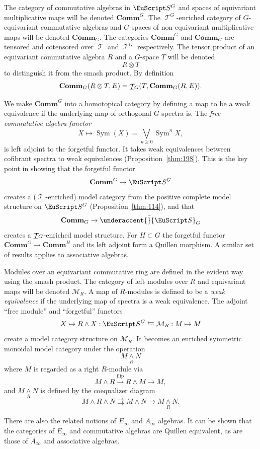 \documentclass{amsart}
\theoremstyle{definition}
\theoremstyle{remark}
\DeclareMathOperator{\sym}{Sym}
\newcommand{\spectra}{\EuScript S}
\newcommand{\rmod}[1]{\mathcal M_{#1}}
\DeclareMathOperator{\spaces}{\mathcal T}
\newcommand{\smashove}[1]{\underset{#1}{\wedge}}
\newcommand{\einfty}{E_{\infty}}
\newcommand{\ainfty}{A_{\infty}}
\newcommand{\einftycat}{\mathbf{Comm}}
\newcommand{\geinftycat}[1]{\einftycat_{#1}}
\newcommand{\ugeinftycat}[1]{\einftycat^{#1}}
\newcommand{\gspaces}[1]{\underline{\spaces\mkern-4mu}\mkern4mu_{\!#1}}
\newcommand{\ugspaces}[1]{\spaces^{#1}}
\newcommand{\gspectra}[1]{\underaccent{\bar}{\spectra}_{#1}}
\newcommand{\ugspectra}[1]{\spectra^{#1}}
\begin{document}
The category of commutative algebras in $\ugspectra{G}$ and spaces of
equivariant multiplicative maps will be denoted $\ugeinftycat{G}$.
The $\ugspaces{G}$-enriched category of $G$-equivariant commutative
algebras and $G$-spaces of non-equivariant multiplicative maps will be
denoted $\geinftycat{G}$.  The categories $\ugeinftycat{G}$ and
$\geinftycat{G}$ are tensored and cotensored over $\spaces$ and
$\ugspaces{G}$ respectively.  The tensor product of an equivariant
commutative algebra $R$ and a $G$-space $T$ will be denoted
\[
R\otimes T
\]
to distinguish it from the smash product.  By definition
\[
\geinftycat{G}(R\otimes T, E) = \gspaces{G}(T,\geinftycat{G}(R,E)).
\]

We make $\ugeinftycat{G}$ into a homotopical category by defining a
map to be a weak equivalence if the underlying map of orthogonal
$G$-spectra is.  The {\em free commutative algebra functor}
\[
X\mapsto \sym(X)=\bigvee_{n\ge 0}\sym^{n}X,
\]
is left adjoint to the forgetful functor.  It takes weak equivalences
between cofibrant spectra to weak equivalences
(Proposition~\ref{thm:198}).  This is the key point in showing that
the forgetful functor
\[
\ugeinftycat{G}\to \ugspectra{G}
\]
creates a ($\spaces$-enriched) model category from the positive
complete model structure on $\ugspectra{G}$
(Proposition~\ref{thm:114}), and that
\[
\geinftycat{G}\to \gspectra{G}
\]
creates a $\gspaces{G}$-enriched model structure.    For $H\subset G$
the forgetful functor $\ugeinftycat{G}\to \ugeinftycat{H}$ and its
left adjoint form a Quillen morphism.   A similar set of results
applies to associative algebras.

Modules over an equivariant commutative ring are defined in the
evident way using the smash product.  The category of left modules
over $R$ and equivariant maps will be denoted $\rmod{R}$.  A map of
$R$-modules is defined to be a {\em weak equivalence} if the
underlying map of spectra is a weak equivalence.  The adjoint ``free
module'' and ``forgetful'' functors
\[
X\mapsto R\wedge X: \ugspectra{G} \leftrightarrows \rmod{R}: M\mapsto M
\]
create a model category structure on $\rmod{R}$.  It becomes an
enriched symmetric monoidal model category under the operation
\[
M\smashove{R}N
\]
where $M$ is regarded as a right $R$-module via
\[
M\wedge R\xrightarrow{\text{flip}} R\wedge M\to M,
\]
and $M\smashove{R}N$ is defined by the coequalizer diagram 
\[
M\wedge R\wedge N\rightrightarrows M\wedge N\to M\smashove{R}N.
\]

There are also the related notions of $\einfty$ and $\ainfty$
algebras.  It can be shown that the categories of $\einfty$ and
commutative algebras are Quillen equivalent, as are those of $\ainfty$
and associative algebras.
\end{document}
